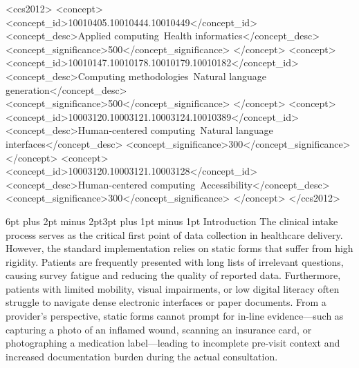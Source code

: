 \documentclass[sigplan,screen]{acmart}
\makeatletter
\renewcommand{\section}{\@startsection{section}{1}{\z@}
  {6pt plus 2pt minus 2pt}{3pt plus 1pt minus 1pt}
  {\normalfont\large\bfseries}}
\makeatother
\begin{document}
\begin{CCSXML}
<ccs2012>
 <concept>
  <concept_id>10010405.10010444.10010449</concept_id>
  <concept_desc>Applied computing~Health informatics</concept_desc>
  <concept_significance>500</concept_significance>
 </concept>
 <concept>
  <concept_id>10010147.10010178.10010179.10010182</concept_id>
  <concept_desc>Computing methodologies~Natural language generation</concept_desc>
  <concept_significance>500</concept_significance>
 </concept>
 <concept>
 <concept_id>10003120.10003121.10003124.10010389</concept_id>
  <concept_desc>Human-centered computing~Natural language interfaces</concept_desc>
  <concept_significance>300</concept_significance>
 </concept>
 <concept>
 <concept_id>10003120.10003121.10003128</concept_id>
  <concept_desc>Human-centered computing~Accessibility</concept_desc>
  <concept_significance>300</concept_significance>
 </concept>
</ccs2012>
\end{CCSXML}




\maketitle
\section{Introduction}
The clinical intake process serves as the critical first point of data collection in healthcare delivery. However, the standard implementation relies on static forms that suffer from high rigidity. Patients are frequently presented with long lists of irrelevant questions, causing survey fatigue and reducing the quality of reported data. Furthermore, patients with limited mobility, visual impairments, or low digital literacy often struggle to navigate dense electronic interfaces or paper documents. From a provider's perspective, static forms cannot prompt for in-line evidence—such as capturing a photo of an inflamed wound, scanning an insurance card, or photographing a medication label—leading to incomplete pre-visit context and increased documentation burden during the actual consultation.
\end{document}
